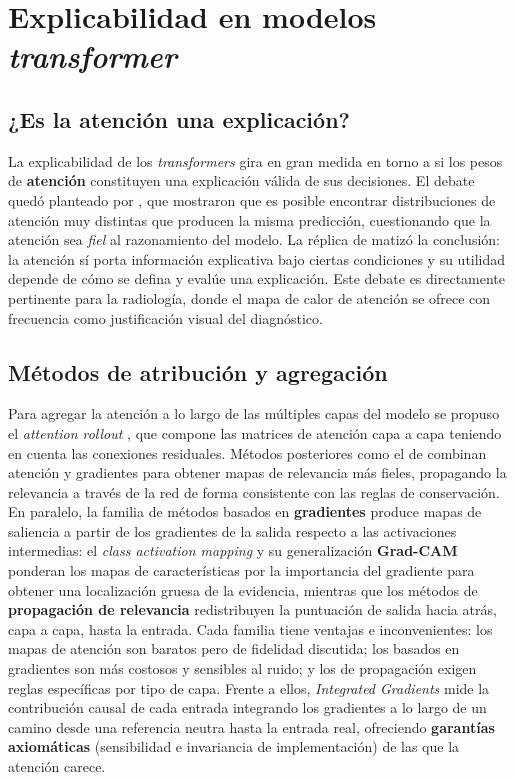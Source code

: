 \section{Explicabilidad en modelos \textit{transformer}}

\subsection{¿Es la atención una explicación?}
La explicabilidad de los \textit{transformers} gira en gran medida en torno a si los pesos de
\textbf{atención} constituyen una explicación válida de sus decisiones. El debate quedó planteado por
\textcite{jain2019}, que mostraron que es posible encontrar distribuciones de atención muy distintas
que producen la misma predicción, cuestionando que la atención sea \emph{fiel} al razonamiento del
modelo. La réplica de \textcite{wiegreffe2019} matizó la conclusión: la atención sí porta información
explicativa bajo ciertas condiciones y su utilidad depende de cómo se defina y evalúe una
explicación. Este debate es directamente pertinente para la radiología, donde el mapa de calor de
atención se ofrece con frecuencia como justificación visual del diagnóstico.

\subsection{Métodos de atribución y agregación}
Para agregar la atención a lo largo de las múltiples capas del modelo se propuso el \textit{attention
rollout} \parencite{abnar2020}, que compone las matrices de atención capa a capa teniendo en cuenta
las conexiones residuales. Métodos posteriores como el de \textcite{chefer2021} combinan atención y
gradientes para obtener mapas de relevancia más fieles, propagando la relevancia a través de la red
de forma consistente con las reglas de conservación. En paralelo, la familia de métodos basados en
\textbf{gradientes} produce mapas de saliencia a partir de los gradientes de la salida respecto a las
activaciones intermedias: el \textit{class activation mapping} y su generalización \textbf{Grad-CAM}
ponderan los mapas de características por la importancia del gradiente para obtener una localización
gruesa de la evidencia, mientras que los métodos de \textbf{propagación de relevancia} redistribuyen la
puntuación de salida hacia atrás, capa a capa, hasta la entrada. Cada familia tiene ventajas e
inconvenientes: los mapas de atención son baratos pero de fidelidad discutida; los basados en
gradientes son más costosos y sensibles al ruido; y los de propagación exigen reglas específicas por
tipo de capa. Frente a ellos, \textit{Integrated
Gradients} \parencite{sundararajan2017} mide la contribución causal de cada entrada integrando los
gradientes a lo largo de un camino desde una referencia neutra hasta la entrada real, ofreciendo
\textbf{garantías axiomáticas} (sensibilidad e invariancia de implementación) de las que la atención
carece.

